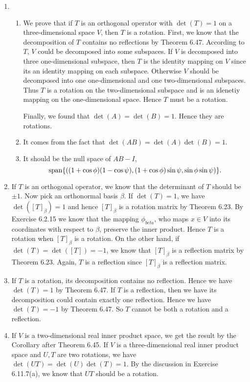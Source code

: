 \begin{enumerate}
\item \begin{enumerate}
\item We prove that if $T$ is an orthogonal operator with $\det(T)=1$ on a three-dimensional space $V$, then $T$ is a rotation. First, we know that the decomposition of $T$ contains no reflections by Theorem 6.47. According to $T$, $V$ could be decomposed into some subspaces. If $V$ is decomposed into three one-dimensional subspace, then $T$ is the identity mapping on $V$ since its an identity mapping on each subspace. Otherwise $V$ should be decomposed into one one-dimensional and one two-dimensional subspaces. Thus $T$ is a rotation on the two-dimensional subspace and is an idenetiy mapping on the one-dimensional space. Hence $T$ must be a rotation.

Finally, we found  that $\det(A)=\det(B)=1$. Hence they are rotations.
\item It comes from the fact that $\det(AB)=\det(A)\det(B)=1$.
\item It should be the null space of $AB-I$,
\[\sp\{((1+\cos\phi)(1-\cos\psi),(1+\cos\phi)\sin\psi,\sin\phi\sin\psi)\}.\]
\end{enumerate}
\item If $T$ is an orthogonal operator, we know that the determinant of $T$ should be $\pm 1$. Now pick an orthonormal basis $\beta$. If $\det(T)=1$, we have $\det([T]_{\beta})=1$ and hence $[T]_{\beta}$ is a rotation matrix by Theorem 6.23. By Exercise 6.2.15 we know that the mapping $\phi_{beta}$, who maps $x\in V$ into its coordinates with respect to $\beta$, preserve the inner product. Hence $T$ is a rotation when $[T]_{\beta}$ is a rotation. On the other hand, if $\det(T)=\det([T])=-1$, we know that $[T]_{\beta}$ is a reflection matrix by Theorem 6.23. Again, $T$ is a reflection since $[T]_ {\beta}$ is a reflection matrix.
\item If $T$ is a rotation, its decomposition contains no reflection. Hence we have $\det(T)=1$ by Theorem 6.47. If $T$ is a reflection, then we have its decomposition could contain exactly one reflection. Hence we have $\det(T)=-1$ by Theorem 6.47. So $T$ cannot be both a rotation and a reflection.
\item If $V$ is a two-dimensional real inner product space, we get the result by the Corollary after Theorem 6.45. If $V$ is a three-dimensional real inner product space and $U,T$ are two rotations, we have $\det(UT)=\det(U)\det(T)=1$. By the discussion in Exercise 6.11.7(a), we know that $UT$ should be a rotation.

\end{enumerate}
